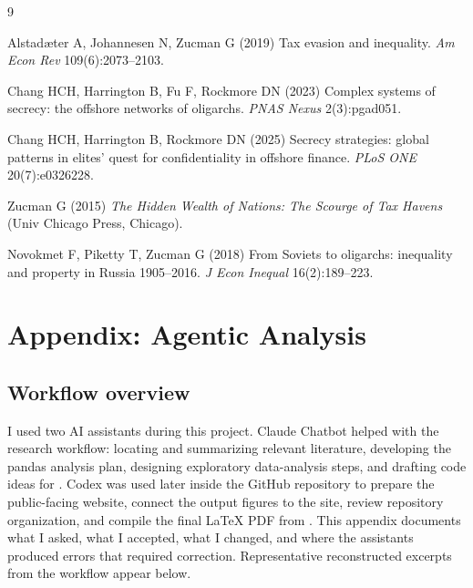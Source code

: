 \documentclass[9pt,twoside]{pnas-new}
\begin{document}

\showacknow

\begin{thebibliography}{9}

Alstad{\ae}ter A, Johannesen N, Zucman G (2019) Tax evasion and inequality. \textit{Am Econ Rev} 109(6):2073--2103.

Chang HCH, Harrington B, Fu F, Rockmore DN (2023) Complex systems of secrecy: the offshore networks of oligarchs. \textit{PNAS Nexus} 2(3):pgad051.

Chang HCH, Harrington B, Rockmore DN (2025) Secrecy strategies: global patterns in elites' quest for confidentiality in offshore finance. \textit{PLoS ONE} 20(7):e0326228.

Zucman G (2015) \textit{The Hidden Wealth of Nations: The Scourge of Tax Havens} (Univ Chicago Press, Chicago).

Novokmet F, Piketty T, Zucman G (2018) From Soviets to oligarchs: inequality and property in Russia 1905--2016. \textit{J Econ Inequal} 16(2):189--223.

\end{thebibliography}

\clearpage
\section*{Appendix: Agentic Analysis}

\subsection*{Workflow overview}

I used two AI assistants during this project. Claude Chatbot helped with the research workflow: locating and summarizing relevant literature, developing the pandas analysis plan, designing exploratory data-analysis steps, and drafting code ideas for . Codex was used later inside the GitHub repository to prepare the public-facing website, connect the output figures to the site, review repository organization, and compile the final LaTeX PDF from . This appendix documents what I asked, what I accepted, what I changed, and where the assistants produced errors that required correction. Representative reconstructed excerpts from the workflow appear below.
\end{document}
